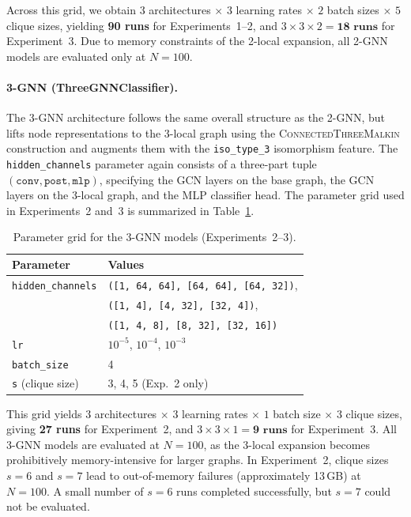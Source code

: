 Across this grid, we obtain $3$ architectures $\times$ $3$ learning rates $\times$ $2$ batch sizes $\times$ $5$ clique sizes, yielding \textbf{90 runs} for Experiments~1–2, and $3 \times 3 \times 2 = \textbf{18 runs}$ for Experiment~3. Due to memory constraints of the 2-local expansion, all 2-GNN models are evaluated only at $N = 100$.


\paragraph{3-GNN (ThreeGNNClassifier).}
The 3-GNN architecture follows the same overall structure as the 2-GNN, but lifts node representations to the 3-local graph using the \textsc{ConnectedThreeMalkin} construction and augments them with the \texttt{iso\_type\_3} isomorphism feature. The \texttt{hidden\_channels} parameter again consists of a three-part tuple $(\texttt{conv}, \texttt{post}, \texttt{mlp})$, specifying the GCN layers on the base graph, the GCN layers on the 3-local graph, and the MLP classifier head. The parameter grid used in Experiments~2 and~3 is summarized in Table~\ref{table:3gnn-grid}.

\begin{table}[h]
\centering
\begin{tabular}{ll}
\toprule
\textbf{Parameter} & \textbf{Values} \\
\midrule
\texttt{hidden\_channels} 
& \texttt{([1, 64, 64], [64, 64], [64, 32])}, \\
& \texttt{([1, 4], [4, 32], [32, 4])}, \\
& \texttt{([1, 4, 8], [8, 32], [32, 16])} \\
\texttt{lr} & $10^{-5}$, $10^{-4}$, $10^{-3}$ \\
\texttt{batch\_size} & 4 \\
\texttt{s} (clique size) & 3, 4, 5 (Exp.~2 only) \\
\bottomrule
\end{tabular}
\caption{Parameter grid for the 3-GNN models (Experiments~2--3).}
\label{table:3gnn-grid}
\end{table}

This grid yields $3$ architectures $\times$ $3$ learning rates $\times$ $1$ batch size $\times$ $3$ clique sizes, giving \textbf{27 runs} for Experiment~2, and $3 \times 3 \times 1 = \textbf{9 runs}$ for Experiment~3. All 3-GNN models are evaluated at $N = 100$, as the 3-local expansion becomes prohibitively memory-intensive for larger graphs. In Experiment~2, clique sizes $s = 6$ and $s = 7$ lead to out-of-memory failures (approximately 13\,GB) at $N = 100$. A small number of $s = 6$ runs completed successfully, but $s = 7$ could not be evaluated.

